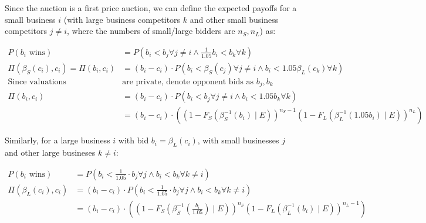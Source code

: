 Since the auction is a first price auction, we can define the expected payoffs
for a small business \(i\) (with large business competitors \(k\) and
other small business competitors \(j \ne i\), where the numbers of
small/large bidders are \(n_S, n_L\)) as:

\[
  \begin{aligned}
    P(b_i \text{ wins}) &= P \left(
    b_i< b_j \forall j \ne i 
   \land \frac{1}{1.05} b_i < b_k \forall k \right) \\
  \Pi(\beta_S(c_i), c_i) = \Pi(b_i, c_i) &= (b_i - c_i) \cdot
    P \left(b_i < \beta_S(c_j) \forall j \neq i \land
    b_i < 1.05 \beta_L(c_k) \forall k \right) \\
  \text{Since valuations } & \text{are private, denote opponent bids as } b_j, b_k \\
  \Pi(b_i, c_i) &= (b_i - c_i) \cdot
    P \left(b_i < b_j \forall j \neq i \land
    b_i < 1.05 b_k \forall k \right) \\
  &= (b_i - c_i) \cdot \left(
    \left( 1 - F_S(\beta_{S}^{-1}(b_i) \mid E) \right)^{n_S - 1}
    \left( 1 - F_L(\beta_{L}^{-1}(1.05b_i) \mid E) \right)^{n_L} \right)
  \end{aligned}
\]

Similarly, for a large business \(i\) with bid \(b_i = \beta_L(c_i)\), with
small businesses \(j\) and other large busineses \(k \ne i\):

\[
  \begin{aligned}
    P(b_i \text{ wins}) &=
    P \left( b_i < \frac{1}{1.05} \cdot b_j \forall j \land
    b_i< b_k \forall k \ne i \right) \\
  \Pi(\beta_L (c_i), c_i) &= (b_i - c_i) \cdot
    P \left( b_i < \frac{1}{1.05} \cdot b_j \forall j \land
    b_i< b_k \forall k \ne i \right) \\
  &= (b_i - c_i) \cdot \left(
    \left( 1 - F_S(\beta_{S}^{-1}(\frac{b_i}{1.05}) \mid E) \right)^{n_S}
    \left( 1 - F_L(\beta_{L}^{-1}(b_i) \mid E) \right)^{n_L - 1} \right)
  \end{aligned}
\]

